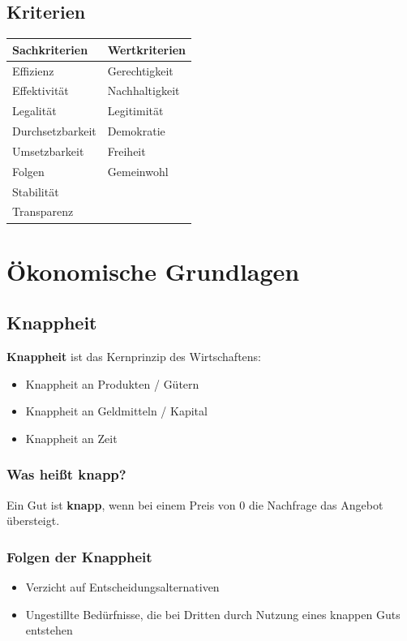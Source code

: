 \documentclass[titlepage,parskip=half]{scrartcl}
\let\Section\section
\renewcommand\section{\clearpage\Section}
\begin{document}
\subsection{Kriterien}
\begin{tabularx}{\textwidth}{|X|X|} \hline
    \textbf{Sachkriterien} & \textbf{Wertkriterien} \\ \hline
    Effizienz & Gerechtigkeit \\ \hline
    Effektivität & Nachhaltigkeit \\ \hline
    Legalität & Legitimität \\ \hline
    Durchsetzbarkeit & Demokratie \\ \hline
    Umsetzbarkeit & Freiheit \\  \hline
    Folgen & Gemeinwohl \\ \hline
    Stabilität & \\ \hline
    Transparenz & \\ \hline
\end{tabularx}

\section{Ökonomische Grundlagen}

\subsection{Knappheit}

\textbf{Knappheit} ist das Kernprinzip des Wirtschaftens:
\begin{itemize}
    \item Knappheit an Produkten / Gütern
    \item Knappheit an Geldmitteln / Kapital
    \item Knappheit an Zeit
\end{itemize}


\subsubsection{Was heißt knapp?}
Ein Gut ist \textbf{knapp}, wenn bei einem Preis von 0 die Nachfrage das Angebot übersteigt.


\subsubsection{Folgen der Knappheit}
\begin{itemize}
    \item Verzicht auf Entscheidungsalternativen
    \item Ungestillte Bedürfnisse, die bei Dritten durch Nutzung eines knappen Guts entstehen
    
\end{itemize}
\end{document}
